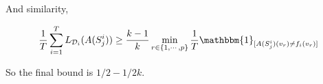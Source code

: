 \documentclass{article}
\begin{document}
\begin{itemize}
\begin{itemize}
And similarity,

	\begin{equation*}
	\frac{1}{T}\sum_{i=1}^T L_{\mathcal{D}_i} (A(S_j^i))\geq\frac{k-1}{k}\min_{r\in\{1,\cdots,p\}}\frac{1}{T}\mathbbm{1}_{[A(S^i_j)(v_r)\neq f_i(v_r)]}
	\end{equation*}
	
	So the final bound is $1/2-1/2k$.
\end{itemize} 

\end{itemize}
\end{document}
